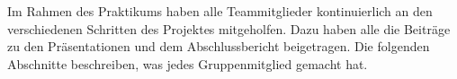 

Im Rahmen des Praktikums haben alle Teammitglieder kontinuierlich an den verschiedenen Schritten des Projektes mitgeholfen. Dazu haben alle die Beiträge zu den Präsentationen und dem Abschlussbericht beigetragen. Die folgenden Abschnitte beschreiben, was jedes Gruppenmitglied gemacht hat.




